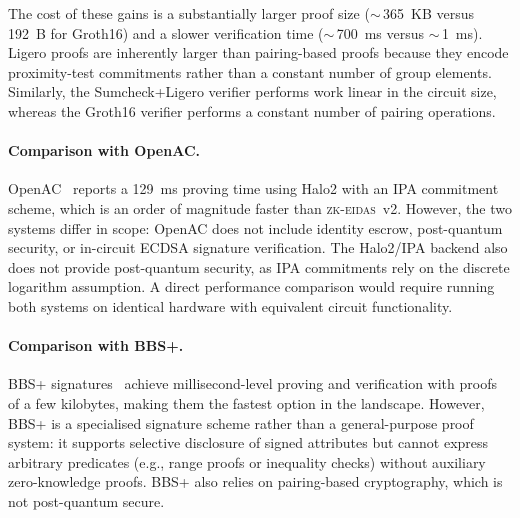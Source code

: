 The cost of these gains is a substantially larger proof size (${\sim}\,$365~KB versus 192~B for Groth16) and a slower verification time (${\sim}\,$700~ms versus ${\sim}\,$1~ms).
Ligero proofs are inherently larger than pairing-based proofs because they encode proximity-test commitments rather than a constant number of group elements.
Similarly, the Sumcheck+Ligero verifier performs work linear in the circuit size, whereas the Groth16 verifier performs a constant number of pairing operations.

\paragraph{Comparison with OpenAC.}
OpenAC~\cite{openac} reports a 129~ms proving time using Halo2 with an IPA commitment scheme, which is an order of magnitude faster than \textsc{zk-eidas}~v2.
However, the two systems differ in scope: OpenAC does not include identity escrow, post-quantum security, or in-circuit ECDSA signature verification.
The Halo2/IPA backend also does not provide post-quantum security, as IPA commitments rely on the discrete logarithm assumption.
A direct performance comparison would require running both systems on identical hardware with equivalent circuit functionality.

\paragraph{Comparison with BBS+.}
BBS+ signatures~\cite{bbs} achieve millisecond-level proving and verification with proofs of a few kilobytes, making them the fastest option in the landscape.
However, BBS+ is a specialised signature scheme rather than a general-purpose proof system: it supports selective disclosure of signed attributes but cannot express arbitrary predicates (e.g., range proofs or inequality checks) without auxiliary zero-knowledge proofs.
BBS+ also relies on pairing-based cryptography, which is not post-quantum secure.

